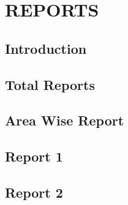 
\chapter{REPORTS	}
\section{Introduction	}
\section{ Total Reports	}
\section{ Area Wise Report	}
\section{ Report 1	}
\section{ Report 2	}





